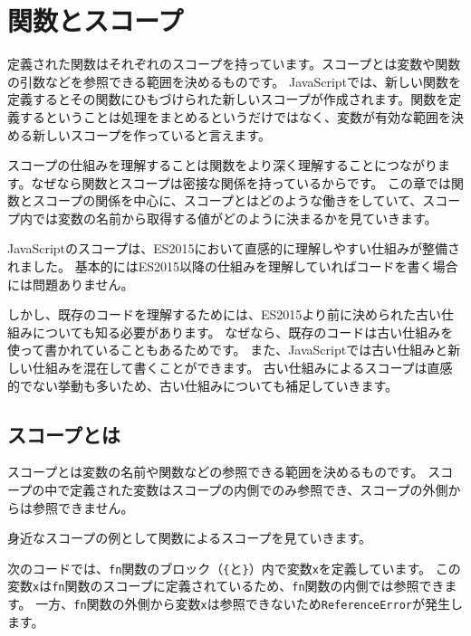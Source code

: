 \hypertarget{function-and-scope}{%
\chapter{関数とスコープ}\label{function-and-scope}}
\thispagestyle{frontheadings}

定義された関数はそれぞれのスコープを持っています。スコープとは変数や関数の引数などを参照できる範囲を決めるものです。
JavaScriptでは、新しい関数を定義するとその関数にひもづけられた新しいスコープが作成されます。関数を定義するということは処理をまとめるというだけではなく、変数が有効な範囲を決める新しいスコープを作っていると言えます。

スコープの仕組みを理解することは関数をより深く理解することにつながります。なぜなら関数とスコープは密接な関係を持っているからです。
この章では関数とスコープの関係を中心に、スコープとはどのような働きをしていて、スコープ内では変数の名前から取得する値がどのように決まるかを見ていきます。

JavaScriptのスコープは、ES2015において直感的に理解しやすい仕組みが整備されました。
基本的にはES2015以降の仕組みを理解していればコードを書く場合には問題ありません。

しかし、既存のコードを理解するためには、ES2015より前に決められた古い仕組みについても知る必要があります。
なぜなら、既存のコードは古い仕組みを使って書かれていることもあるためです。
また、JavaScriptでは古い仕組みと新しい仕組みを混在して書くことができます。
古い仕組みによるスコープは直感的でない挙動も多いため、古い仕組みについても補足していきます。

\hypertarget{what-is-scope}{%
\section{スコープとは}\label{what-is-scope}}

スコープとは変数の名前や関数などの参照できる範囲を決めるものです。
スコープの中で定義された変数はスコープの内側でのみ参照でき、スコープの外側からは参照できません。

身近なスコープの例として関数によるスコープを見ていきます。

次のコードでは、\texttt{fn}関数のブロック（\texttt{\{}と\texttt{\}}）内で変数\texttt{x}を定義しています。
この変数\texttt{x}は\texttt{fn}関数のスコープに定義されているため、\texttt{fn}関数の内側では参照できます。
一方、\texttt{fn}関数の外側から変数\texttt{x}は参照できないため\texttt{ReferenceError}が発生します。

